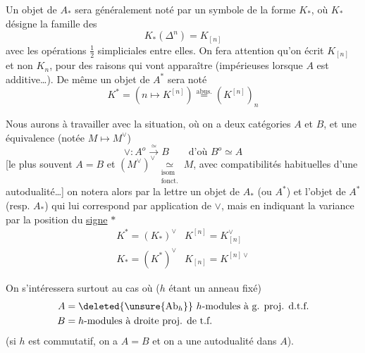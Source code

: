 Un objet de $A_*$ sera généralement noté par un symbole de la forme $K_*$, où $K_*$ désigne la famille des
\[ K_*(\Delta^n)=K_{[n]} \]
avec les opérations $\tfrac12$ simpliciales entre elles.
On fera attention qu'on écrit $K_{[n]}$ et non $K_n$, pour des raisons qui vont apparaître (impérieuses lorsque $A$ est additive\ldots).
De même un objet de $A^*$ sera noté
\[ K^*=(n\longmapsto K^{[n]})\overset{\text{abus.}}{=}(K^{[n]})_n \]

Nous aurons à travailler avec la situation, où on a deux catégories $A$ et $B$, et une équivalence (notée \deleted{$\unsure{\vee^*}$} $M\mapsto M^\vee$)
\[ \vee:A^o\overset\simeq\longrightarrow B\qquad\text{d'où }B^o\simeq A \]
[le plus souvent $A=B$ et $(M^\vee)^\vee\underset{\substack{\text{isom}\\\text{fonct.}}}{\simeq}M$, avec compatibilités habituelles d'une autodualité\ldots]
on notera alors  par la  lettre un objet de $A_*$ (ou $A^*$) et l'objet de $A^*$ (resp. $A_*$) qui lui correspond par application de $\vee$, mais en indiquant la variance par la position du \uline{signe} $*$
\[
\begin{array}{ll}
K^*=(K_*)^\vee&K^{[n]}=K_{[n]}^\vee\\
K_*=(K^*)^\vee&K_{[n]}=K^{[n]\vee}
\end{array}
\]

On s'intéressera surtout au cas où ($h$ étant un anneau fixé) 
\[
\begin{aligned}
A&=\deleted{\unsure{\mathrm{Ab}_h}}\ h\text{-modules à g. proj. d.t.f.}\\
B&=h\text{-modules à droite proj. de t.f.}
\end{aligned}
\]
(si $h$ est commutatif, on a $A=B$ et on a une autodualité dans $A$).

